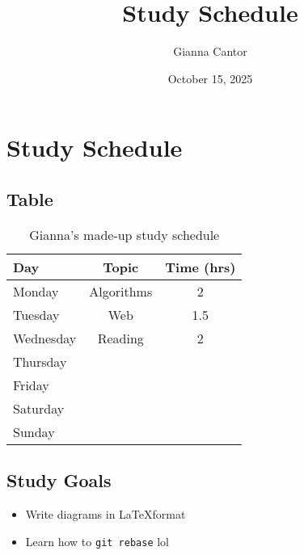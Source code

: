 \documentclass{article}
\title{Study Schedule}
\author{Gianna Cantor}
\date{October 15, 2025}
\begin{document}
\maketitle

\section{Study Schedule}
\subsection{Table}
\begin{table}[h!]
    \centering
    \begin{tabular}{l c c}
    \hline
        Day & Topic & Time (hrs) \\
    \hline
    \hline
        Monday & Algorithms & 2 \\
        Tuesday & Web & 1.5 \\
        Wednesday & Reading & 2 \\
        Thursday & \text{---} & \text{---} \\
        Friday & \text{---} & \text{---} \\
        Saturday & \text{---} & \text{---} \\
        Sunday & \text{---} & \text{---}
    \end{tabular}
    \caption{Gianna's made-up study schedule}
    \label{tab:placeholder}
\end{table}

\subsection{Study Goals}
\begin{itemize}
    \item Write diagrams in \LaTeX format
    \item Learn how to \texttt{git rebase} lol
\end{itemize}
\end{document}
